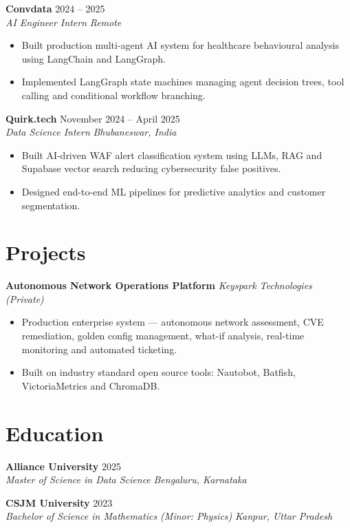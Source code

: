\documentclass[letterpaper,11pt]{article}
\newcommand{\resumeitem}[1]{\item #1}
\newcommand{\entry}[4]{%
  \noindent
  \textbf{#1} \hfill #2 \\
  \textit{#3} \hfill \textit{#4} \par
}
\begin{document}
\vspace{6pt}
\entry{Convdata}{2024 -- 2025}{AI Engineer Intern}{Remote}
\begin{itemize}
  \resumeitem{Built production multi-agent AI system for healthcare behavioural analysis using
              LangChain and LangGraph.}
  \resumeitem{Implemented LangGraph state machines managing agent decision trees, tool calling and
              conditional workflow branching.}
\end{itemize}

\vspace{6pt}
\entry{Quirk.tech}{November 2024 -- April 2025}{Data Science Intern}{Bhubaneswar, India}
\begin{itemize}
  \resumeitem{Built AI-driven WAF alert classification system using LLMs, RAG and Supabase vector
              search reducing cybersecurity false positives.}
  \resumeitem{Designed end-to-end ML pipelines for predictive analytics and customer segmentation.}
\end{itemize}

\section{Projects}

\noindent\textbf{Autonomous Network Operations Platform} \hfill \textit{Keyspark Technologies (Private)}
\begin{itemize}
  \resumeitem{Production enterprise system --- autonomous network assessment, CVE remediation,
              golden config management, what-if analysis, real-time monitoring and automated ticketing.}
  \resumeitem{Built on industry standard open source tools: Nautobot, Batfish, VictoriaMetrics
              and ChromaDB.}
\end{itemize}

\section{Education}

\entry{Alliance University}{2025}{Master of Science in Data Science}{Bengaluru, Karnataka}

\vspace{6pt}
\entry{CSJM University}{2023}{Bachelor of Science in Mathematics (Minor: Physics)}{Kanpur, Uttar Pradesh}

\end{document}
